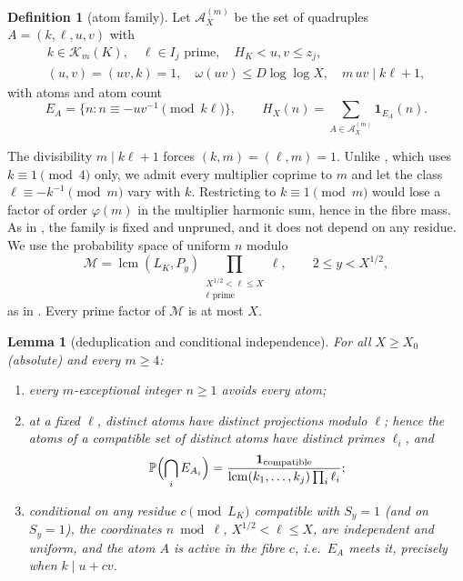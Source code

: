 \documentclass[10pt,reqno]{amsart}
\newtheorem{lemma}[theorem]{Lemma}
\theoremstyle{definition}
\newtheorem{definition}[theorem]{Definition}
\newcommand{\K}{\mathcal K}
\newcommand{\A}{\mathcal A}
\newcommand{\M}{\mathcal M}
\newcommand{\Prob}{\mathbb P}
\newcommand{\ind}{\mathbf 1}
\newcommand{\lcm}{\operatorname{lcm}}
\begin{document}
\begin{definition}[atom family]\label{def:atoms}
Let $\A^{(m)}_X$ be the set of quadruples $A=(k,\ell,u,v)$ with
\begin{equation}\label{eq:atomdef}
 \begin{gathered}
 k\in\K_m(K),\quad \ell\in I_j\text{ prime},\quad H_K<u,v\leq z_j,\\
 (u,v)=(uv,k)=1,\quad \omega(uv)\leq D\log\log X,
 \quad m\,uv\mid k\ell+1,
 \end{gathered}
\end{equation}
with atoms and atom count
\[
 E_A=\{n:n\equiv-uv^{-1}\pmod{k\ell}\},\qquad
 H_X(n)=\sum_{A\in\A^{(m)}_X}\ind_{E_A}(n).
\]
\end{definition}

The divisibility $m\mid k\ell+1$ forces $(k,m)=(\ell,m)=1$.  Unlike
\cite{TQ}, which uses $k\equiv1\pmod 4$ only, we admit every multiplier
coprime to $m$ and let the class $\ell\equiv-k^{-1}\pmod m$ vary with $k$.
Restricting to $k\equiv1\pmod m$ would lose a factor of order
$\varphi(m)$ in the multiplier harmonic sum, hence in the fibre mass.
As in \cite{TQ}, the family is fixed and unpruned, and it does not depend
on any residue.  We use the probability space of uniform $n$ modulo
\begin{equation}\label{eq:space}
 \M=\lcm(L_K,P_y)\prod_{\substack{X^{1/2}<\ell\leq X\\\ell\text{ prime}}}\ell,
 \qquad 2\leq y<X^{1/2},
\end{equation}
as in \cite[(7)]{TQ}.  Every prime factor of $\M$ is at most $X$.

\begin{lemma}[deduplication and conditional independence]\label{lem:CRT}
For all $X\geq X_0$ \textup{(}absolute\textup{)} and every $m\geq4$:
\begin{enumerate}
\item every $m$-exceptional integer $n\geq1$ avoids every atom;
\item at a fixed $\ell$, distinct atoms have distinct projections
modulo $\ell$; hence the atoms of a compatible set of distinct atoms
have distinct primes $\ell_i$, and
\[
 \Prob\Bigl(\bigcap_iE_{A_i}\Bigr)
 =\frac{\ind_{\rm compatible}}{\lcm(k_1,\ldots,k_j)\prod_i\ell_i};
\]
\item conditional on any residue $c\pmod{L_K}$ compatible with
$S_y=1$ \textup{(}and on $S_y=1$\textup{)}, the coordinates $n\bmod\ell$, $X^{1/2}<\ell\leq X$,
are independent and uniform, and the atom $A$ is \emph{active} in the
fibre $c$, i.e.\ $E_A$ meets it, precisely when $k\mid u+cv$.
\end{enumerate}
\end{lemma}
\end{document}
